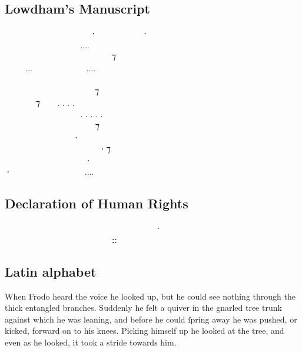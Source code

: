 \documentclass[11pt,a4paper]{article}
\begin{document}
\subsection*{Lowdham’s Manuscript}
\tengtelc
  ‍   ⸱‍  ‍ ⸱ \\
    ‍....  ‍  \\
  ‍   ‍ ‍ ⁊ ‍  \\
...  ....   \\
         ‍ \\
 ‍ ‍‍   ⁊  ‍ ‍ \\
 ‍ ⁊  . . . .  ‍ ‍‍   \\
   ‍ . . . . . ‍ ‍   \\
      ⁊    \\
   ‍⸱‍   ‍  \\
     ‍⸱ ⁊  ‍ \\
    ⸱    \\
⸱  ‍  .... ‍‍    \\

\subsection*{Declaration of Human Rights}
\tengtelcb
\begin{center}
           ⸱                   ⸬
\end{center}

\subsection*{Latin alphabet}
\tengtelcb
When Frodo heard the voice he looked up, but he could
see nothing through the thick entangled branches.
Suddenly he felt a quiver in the gnarled tree trunk
against which he was leaning, and before he could
ſpring away he was pushed, or kicked, forward on to
his knees. Picking himself up he looked at the tree,
and even as he looked, it took a stride towards him.
\normalfont
\end{document}
